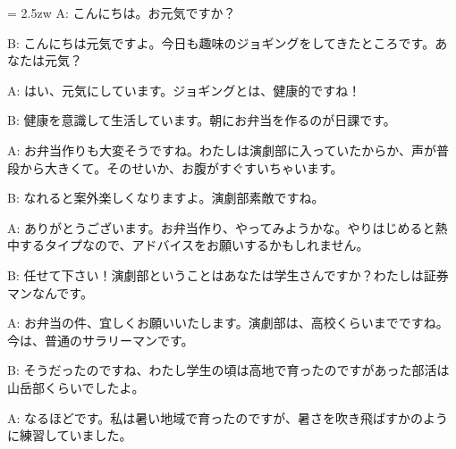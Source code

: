\documentclass[11pt]{amsart}
\title{}
\author{}
\newenvironment{hangall}[1]{\hangindent = 2.5zw\everypar{\hangindent = 2.5zw}}{}
\begin{document}
\maketitle
\begin{hangall}{}%
A: こんにちは。お元気ですか？

B: こんにちは元気ですよ。今日も趣味のジョギングをしてきたところです。あなたは元気？

A: はい、元気にしています。ジョギングとは、健康的ですね！

B: 健康を意識して生活しています。朝にお弁当を作るのが日課です。

A: お弁当作りも大変そうですね。わたしは演劇部に入っていたからか、声が普段から大きくて。そのせいか、お腹がすぐすいちゃいます。

B: なれると案外楽しくなりますよ。演劇部素敵ですね。

A: ありがとうございます。お弁当作り、やってみようかな。やりはじめると熱中するタイプなので、アドバイスをお願いするかもしれません。

B: 任せて下さい！演劇部ということはあなたは学生さんですか？わたしは証券マンなんです。

A: お弁当の件、宜しくお願いいたします。演劇部は、高校くらいまでですね。今は、普通のサラリーマンです。

B: そうだったのですね、わたし学生の頃は高地で育ったのですがあった部活は山岳部くらいでしたよ。

A: なるほどです。私は暑い地域で育ったのですが、暑さを吹き飛ばすかのように練習していました。
\end{hangall}
\end{document}
